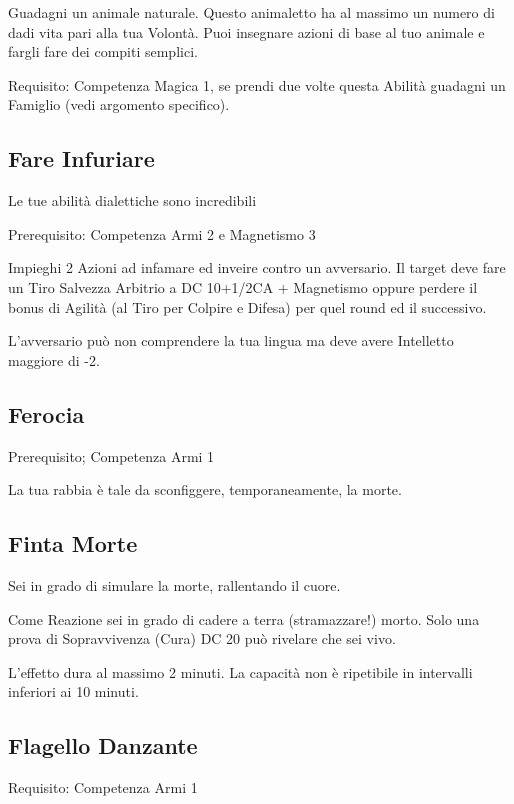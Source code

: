 \documentclass[a4paper,11pt,twoside,openany]{book}
\begin{document}
Guadagni un animale naturale. Questo animaletto ha al massimo un numero di dadi vita pari alla tua Volontà. Puoi insegnare azioni di base al tuo animale e fargli fare dei compiti semplici.

Requisito: Competenza Magica 1, se prendi due volte questa Abilità guadagni un Famiglio (vedi argomento specifico).

\subsection{Fare Infuriare}

Le tue abilità dialettiche sono incredibili

Prerequisito: Competenza Armi 2 e Magnetismo 3

Impieghi 2 Azioni ad infamare ed inveire contro un avversario. Il target deve fare un Tiro Salvezza Arbitrio a DC 10+1/2CA + Magnetismo oppure perdere il bonus di Agilità (al Tiro per Colpire e Difesa) per quel round ed il successivo.

L'avversario può non comprendere la tua lingua ma deve avere Intelletto maggiore di -2.

\subsection{Ferocia}

Prerequisito; Competenza Armi 1

La tua rabbia è tale da sconfiggere, temporaneamente, la morte.

\subsection{Finta Morte}

Sei in grado di simulare la morte, rallentando il cuore.

Come Reazione sei in grado di cadere a terra (stramazzare!) morto. Solo una prova di Sopravvivenza (Cura) DC 20 può rivelare che sei vivo.

L'effetto dura al massimo 2 minuti. La capacità non è ripetibile in intervalli inferiori ai 10 minuti.

\subsection{Flagello Danzante}

Requisito: Competenza Armi 1
\end{document}
